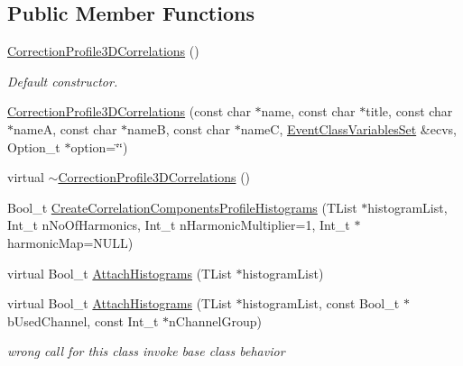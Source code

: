 \subsection*{Public Member Functions}
\begin{DoxyCompactItemize}
\item 
\mbox{\label{classQn_1_1CorrectionProfile3DCorrelations_a722a477bfa5bcd930256b71e8616414f}} 
\mbox{\hyperlink{classQn_1_1CorrectionProfile3DCorrelations_a722a477bfa5bcd930256b71e8616414f}{Correction\+Profile3\+D\+Correlations}} ()
\begin{DoxyCompactList}\small\item\em Default constructor. \end{DoxyCompactList}\item 
\mbox{\hyperlink{classQn_1_1CorrectionProfile3DCorrelations_a7894d83ced5e0e9d7d4022984483c7d2}{Correction\+Profile3\+D\+Correlations}} (const char $\ast$name, const char $\ast$title, const char $\ast$nameA, const char $\ast$nameB, const char $\ast$nameC, \mbox{\hyperlink{classQn_1_1EventClassVariablesSet}{Event\+Class\+Variables\+Set}} \&ecvs, Option\+\_\+t $\ast$option=\char`\"{}\char`\"{})
\item 
virtual \mbox{\hyperlink{classQn_1_1CorrectionProfile3DCorrelations_a9f38225f6e469281047c83b2aaa9c495}{$\sim$\+Correction\+Profile3\+D\+Correlations}} ()
\item 
Bool\+\_\+t \mbox{\hyperlink{classQn_1_1CorrectionProfile3DCorrelations_aac1dd44c1c32c8e017c97cbac5cd911c}{Create\+Correlation\+Components\+Profile\+Histograms}} (T\+List $\ast$histogram\+List, Int\+\_\+t n\+No\+Of\+Harmonics, Int\+\_\+t n\+Harmonic\+Multiplier=1, Int\+\_\+t $\ast$harmonic\+Map=N\+U\+LL)
\item 
virtual Bool\+\_\+t \mbox{\hyperlink{classQn_1_1CorrectionProfile3DCorrelations_a6d6a1895f3362cd539f0249ad42d8b9c}{Attach\+Histograms}} (T\+List $\ast$histogram\+List)
\item 
\mbox{\label{classQn_1_1CorrectionProfile3DCorrelations_a33bc769de702c401caa21b2d03cc705a}} 
virtual Bool\+\_\+t \mbox{\hyperlink{classQn_1_1CorrectionProfile3DCorrelations_a33bc769de702c401caa21b2d03cc705a}{Attach\+Histograms}} (T\+List $\ast$histogram\+List, const Bool\+\_\+t $\ast$b\+Used\+Channel, const Int\+\_\+t $\ast$n\+Channel\+Group)
\begin{DoxyCompactList}\small\item\em wrong call for this class invoke base class behavior \end{DoxyCompactList}\item 

\end{DoxyCompactItemize}
